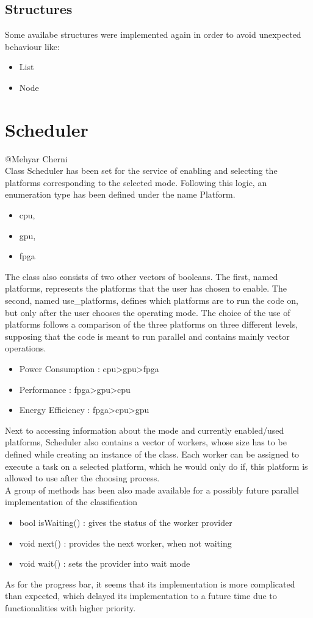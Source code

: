 \documentclass[parskip=full]{scrartcl}
\newcommand\tab[1][1cm]{\hspace*{#1}}
\begin{document}
	\subsection{Structures} \label{Structures}
		\tab Some availabe structures were implemented again in order to avoid unexpected behaviour like:
		\begin{itemize}
			\item List
			\item Node
		\end{itemize} 
		
\pagebreak

\section{Scheduler} \label{Scheduler}
	@Mehyar Cherni\\
	\tab Class Scheduler has been set for the service of enabling and selecting the platforms corresponding to the selected mode. Following this logic, an enumeration type has been defined under the name Platform.
	\begin {itemize}
		\item cpu, 
		\item gpu, 
		\item fpga
	\end{itemize}
	The class also consists of two other vectors of booleans. The first, named platforms, represents the platforms that the user has chosen to enable. The second, named use\_platforms, defines which platforms are to run the code on, but only after the user chooses the operating mode. The choice of the use of platforms follows a comparison of the three platforms on three different levels, supposing that the code is meant to run parallel and contains mainly vector operations.
	\begin {itemize}
		\item Power Consumption : cpu>gpu>fpga
		\item Performance : fpga>gpu>cpu
		\item Energy Efficiency : fpga>cpu>gpu
	\end{itemize}
Next to accessing information about the mode and currently enabled/used platforms, Scheduler also contains a vector of workers, whose size has to be defined while creating an instance of the class. Each worker can be assigned to execute a task on a selected platform, which he would only do if, this platform is allowed to use after the choosing process. \\A group of methods has been also made available for a possibly future parallel implementation of the classification
	\begin {itemize}
		\item bool isWaiting() : gives the status of the worker provider
		\item void next() : provides the next worker, when not waiting
		\item void wait() : sets the provider into wait mode
	\end{itemize}
As for the progress bar, it seems that its implementation is more complicated than expected, which delayed its implementation to a future time due to functionalities with higher priority.
	
\end{document}

